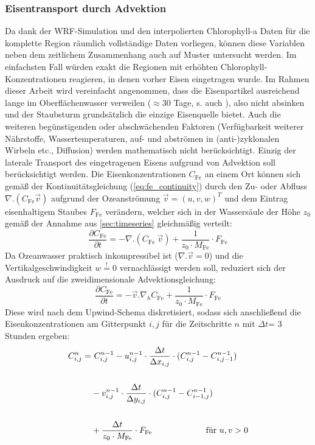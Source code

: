 \documentclass[12pt,a4paper,onecolumn]{scrartcl}
\begin{document}
\subsubsection{Eisentransport durch Advektion} \label{sec:methods_advection}
Da dank der WRF-Simulation und den interpolierten Chlorophyll-a Daten \citep{Saulquin.2019} für die komplette Region räumlich vollständige Daten vorliegen, können diese Variablen neben dem zeitlichem Zusammenhang auch auf Muster untersucht werden. Im einfachsten Fall würden exakt die Regionen mit erhöhten Chlorophyll-Konzentrationen reagieren, in denen vorher Eisen eingetragen wurde. Im Rahmen dieser Arbeit wird vereinfacht angenommen, dass die Eisenpartikel ausreichend lange im Oberflächenwasser verweilen ($\approx$30 Tage, s. auch \citet{Cropp.2013}), also nicht absinken und der Staubsturm grundsätzlich die einzige Eisenquelle bietet. Auch die weiteren begünstigenden oder abschwächenden Faktoren (Verfügbarkeit weiterer Nährstoffe, Wassertemperaturen, auf- und abströmen in (anti-)zyklonalen Wirbeln etc., Diffusion) werden mathematisch nicht berücksichtigt. Einzig der laterale Transport des eingetragenen Eisens aufgrund von Advektion soll berücksichtigt werden. Die Eisenkonzentrationen $C_\text{Fe}$ an einem Ort können sich gemäß der Kontinuitätsgleichung (\ref{eq:fe_continuity}) durch den Zu- oder Abfluss $\nabla . (C_\text{Fe} \vec{v})$ aufgrund der Ozeanströmung $\vec{v} = (u,v,w)^T$  und dem Eintrag eisenhaltigem Staubes $F_\text{Fe}$ verändern, welcher sich in der Wassersäule der Höhe $z_0$ gemäß der Annahme aus \ref{sec:timeseries} gleichmäßig verteilt:
\begin{equation}
\frac{\partial C_\text{Fe}}{\partial t} = - \nabla . (C_\text{Fe} \ \vec{v}) + \frac{1}{z_0 \cdot M_\text{Fe}} \cdot F_\text{Fe} \label{eq:fe_continuity}
\end{equation}
Da Ozeanwasser praktisch inkompressibel ist ($\nabla . \vec{v}=0$) und die Vertikalgeschwindigkeit $w\overset{!}{=}0$ vernachlässigt werden soll, reduziert sich der Ausdruck auf die zweidimensionale Advektionsgleichung:
\begin{equation}
\frac{\partial C_\text{Fe}}{\partial t} = - \vec{v} . \nabla_h  C_\text{Fe}  + \frac{1}{z_0 \cdot M_\text{Fe}} \cdot F_\text{Fe} \label{eq:fe_advection}
\end{equation}
Diese wird nach dem Upwind-Schema diskretisiert, sodass sich anschließend die Eisenkonzentrationen am Gitterpunkt $i,j$ für die Zeitschritte $n$ mit $\Delta t$= 3 Stunden ergeben:
\begin{equation}
\begin{split}
C_{i,j}^n = &\ C_{i,j}^{n-1} - u_{i,j}^{n-1} \cdot \frac{\Delta t}{\Delta x_{i,j}} \cdot (C_{i,j}^{n-1} - C_{i,j-1}^{n-1}) \\\\
&- v_{i,j}^{n-1} \cdot \frac{\Delta t}{\Delta y_{i,j}} \cdot (C_{i,j}^{n-1} - C_{i-1,j}^{n-1})  \\\\
&+ \frac{\Delta t}{z_0 \cdot M_\text{Fe}} \cdot F_\text{Fe} \text{ \qquad  \qquad \qquad für } u,v > 0
\end{split}
\end{equation}
\end{document}
